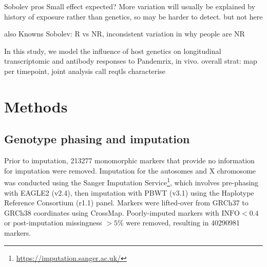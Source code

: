 Sobolev pros
    Small effect expected?
    More variation will usually be explained by history of exposure rather than genetics, so may be harder to detect.
    but not here

also Knowns
    Sobolev: R vs NR, 
    inconsistent variation in why people are NR

In this study, we model the influence of host genetics on longitudinal transcriptomic and antibody responses to Pandemrix, in vivo.
    overall strat: map per timepoint, joint analysis
    call reqtls
    characterise

\section{Methods}

\subsection{Genotype phasing and imputation}
\label{subsec:hird_reQTL_methods_genotypePhasingAndImputation}

Prior to imputation, 213277 monomorphic markers that provide no information for imputation were removed.
Imputation for the autosomes and X chromosome was conducted using the Sanger Imputation Service\footnote{\url{https://imputation.sanger.ac.uk/}}, which involves pre-phasing with EAGLE2 (v2.4), then imputation with PBWT (v3.1) using the Haplotype Reference Consortium (r1.1) panel.
Markers were lifted-over from GRCh37 to GRCh38 coordinates using CrossMap.
Poorly-imputed markers with $\text{INFO} < 0.4$ or post-imputation missingness $> 5\%$ were removed, resulting in 40290981 markers.

